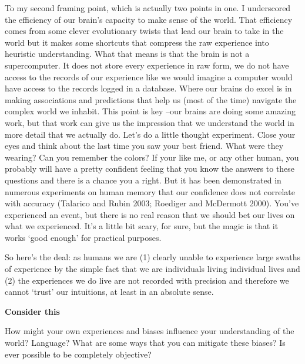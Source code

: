 \documentclass[
  letterpaper,
]{latex/krantz}
\begin{document}
To my second framing point, which is actually two points in one. I
underscored the efficiency of our brain's capacity to make sense of the
world. That efficiency comes from some clever evolutionary twists that
lead our brain to take in the world but it makes some shortcuts that
compress the raw experience into heuristic understanding. What that
means is that the brain is not a supercomputer. It does not store every
experience in raw form, we do not have access to the records of our
experience like we would imagine a computer would have access to the
records logged in a database. Where our brains do excel is in making
associations and predictions that help us (most of the time) navigate
the complex world we inhabit. This point is key --our brains are doing
some amazing work, but that work can give us the impression that we
understand the world in more detail that we actually do. Let's do a
little thought experiment. Close your eyes and think about the last time
you saw your best friend. What were they wearing? Can you remember the
colors? If your like me, or any other human, you probably will have a
pretty confident feeling that you know the answers to these questions
and there is a chance you a right. But it has been demonstrated in
numerous experiments on human memory that our confidence does not
correlate with accuracy (Talarico and Rubin 2003; Roediger and McDermott
2000). You've experienced an event, but there is no real reason that we
should bet our lives on what we experienced. It's a little bit scary,
for sure, but the magic is that it works `good enough' for practical
purposes.

So here's the deal: as humans we are (1) clearly unable to experience
large swaths of experience by the simple fact that we are individuals
living individual lives and (2) the experiences we do live are not
recorded with precision and therefore we cannot `trust' our intuitions,
at least in an absolute sense.

\begin{tcolorbox}[enhanced jigsaw, arc=.35mm, leftrule=.75mm, rightrule=.15mm, opacityback=0, colback=white, breakable, bottomrule=.15mm, left=2mm, toprule=.15mm]

\textbf{ Consider this}

How might your own experiences and biases influence your understanding
of the world? Language? What are some ways that you can mitigate these
biases? Is ever possible to be completely objective?

\end{tcolorbox}
\end{document}

